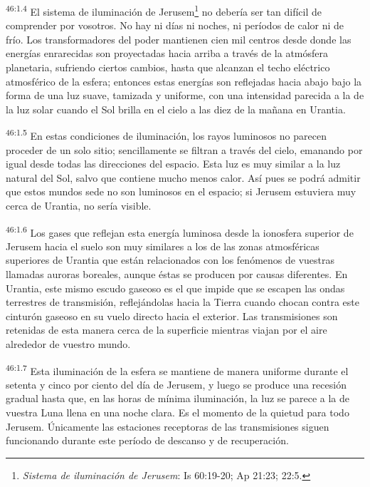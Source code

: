 \par
\textsuperscript{46:1.4} El sistema de iluminación de Jerusem\footnote{\textit{Sistema de iluminación de Jerusem}: Is 60:19-20; Ap 21:23; 22:5.} no debería ser tan difícil de comprender por vosotros. No hay ni días ni noches, ni períodos de calor ni de frío. Los transformadores del poder mantienen cien mil centros desde donde las energías enrarecidas son proyectadas hacia arriba a través de la atmósfera planetaria, sufriendo ciertos cambios, hasta que alcanzan el techo eléctrico atmosférico de la esfera; entonces estas energías son reflejadas hacia abajo bajo la forma de una luz suave, tamizada y uniforme, con una intensidad parecida a la de la luz solar cuando el Sol brilla en el cielo a las diez de la mañana en Urantia.

\par
\textsuperscript{46:1.5} En estas condiciones de iluminación, los rayos luminosos no parecen proceder de un solo sitio; sencillamente se filtran a través del cielo, emanando por igual desde todas las direcciones del espacio. Esta luz es muy similar a la luz natural del Sol, salvo que contiene mucho menos calor. Así pues se podrá admitir que estos mundos sede no son luminosos en el espacio; si Jerusem estuviera muy cerca de Urantia, no sería visible.

\par
\textsuperscript{46:1.6} Los gases que reflejan esta energía luminosa desde la ionosfera superior de Jerusem hacia el suelo son muy similares a los de las zonas atmosféricas superiores de Urantia que están relacionados con los fenómenos de vuestras llamadas auroras boreales, aunque éstas se producen por causas diferentes. En Urantia, este mismo escudo gaseoso es el que impide que se escapen las ondas terrestres de transmisión, reflejándolas hacia la Tierra cuando chocan contra este cinturón gaseoso en su vuelo directo hacia el exterior. Las transmisiones son retenidas de esta manera cerca de la superficie mientras viajan por el aire alrededor de vuestro mundo.

\par
\textsuperscript{46:1.7} Esta iluminación de la esfera se mantiene de manera uniforme durante el setenta y cinco por ciento del día de Jerusem, y luego se produce una recesión gradual hasta que, en las horas de mínima iluminación, la luz se parece a la de vuestra Luna llena en una noche clara. Es el momento de la quietud para todo Jerusem. Únicamente las estaciones receptoras de las transmisiones siguen funcionando durante este período de descanso y de recuperación.

